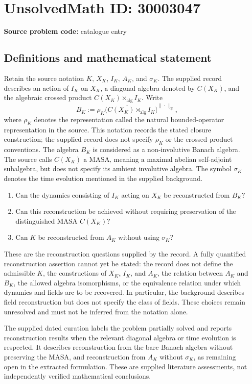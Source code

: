 \documentclass[11pt]{article}
\begin{document}
\section*{UnsolvedMath ID: 30003047}
\textbf{Source problem code:} catalogue entry
\subsection{Definitions and mathematical statement}
Retain the source notation \(K\), \(X_K\), \(I_K\), \(A_K\), and \(\sigma_K\). The supplied record describes an action of \(I_K\) on \(X_K\), a diagonal algebra denoted by \(C(X_K)\), and the algebraic crossed product \(C(X_K)\rtimes_{\mathrm{alg}} I_K\). Write
\[
B_K:=\overline{\rho_K\bigl(C(X_K)\rtimes_{\mathrm{alg}} I_K\bigr)}^{\|\cdot\|_{\mathrm{op}}},
\]
where \(\rho_K\) denotes the representation called the natural bounded-operator representation in the source. This notation records the stated closure construction; the supplied record does not specify \(\rho_K\) or the crossed-product conventions. The algebra \(B_K\) is considered as a non-involutive Banach algebra. The source calls \(C(X_K)\) a MASA, meaning a maximal abelian self-adjoint subalgebra, but does not specify its ambient involutive algebra. The symbol \(\sigma_K\) denotes the time evolution mentioned in the supplied background.

\begin{enumerate}
\item Can the dynamics consisting of \(I_K\) acting on \(X_K\) be reconstructed from \(B_K\)?
\item Can this reconstruction be achieved without requiring preservation of the distinguished MASA \(C(X_K)\)?
\item Can \(K\) be reconstructed from \(A_K\) without using \(\sigma_K\)?
\end{enumerate}

These are the reconstruction questions supplied by the record. A fully quantified reconstruction assertion cannot yet be stated: the record does not define the admissible \(K\), the constructions of \(X_K\), \(I_K\), and \(A_K\), the relation between \(A_K\) and \(B_K\), the allowed algebra isomorphisms, or the equivalence relation under which dynamics and fields are to be recovered. In particular, the background describes field reconstruction but does not specify the class of fields. These choices remain unresolved and must not be inferred from the notation alone.

The supplied dated curation labels the problem partially solved and reports reconstruction results when the relevant diagonal algebra or time evolution is respected. It describes reconstruction from the bare Banach algebra without preserving the MASA, and reconstruction from \(A_K\) without \(\sigma_K\), as remaining open in the extracted formulation. These are supplied literature assessments, not independently verified mathematical conclusions.
\end{document}

